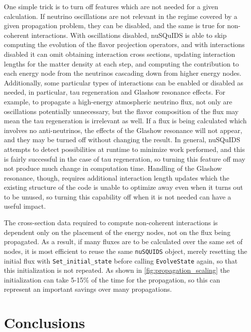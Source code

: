\documentclass[3p,12pt]{elsarticle}
\newcommand{\ttf}{\ttfamily}
\begin{document}
One simple trick is to turn off features which are not needed for a given calculation. 
If neutrino oscillations are not relevant in the regime covered by a given propagation problem, they can be disabled, and the same is true for non-coherent interactions. 
With oscillations disabled, {\ttf nuSQuIDS} is able to skip computing the evolution of the flavor projection operators, and with interactions disabled it can omit obtaining interaction cross sections, updating interaction lengths for the matter density at each step, and computing the contribution to each energy node from the neutrinos cascading down from higher energy nodes. 
Additionally, some particular types of interactions can be enabled or disabled as needed, in particular, tau regeneration and Glashow resonance effects. 
For example, to propagate a high-energy atmospheric neutrino flux, not only are oscillations potentially unnecessary, but the flavor composition of the flux may mean the tau regeneration is irrelevant as well. 
If a flux is being calculated which involves no anti-neutrinos, the effects of the Glashow resonance will not appear, and they may be turned off without changing the result. 
In general, {\ttf nuSQuIDS} attempts to detect possibilities at runtime to minimize work performed, and this is fairly successful in the case of tau regeneration, so turning this feature off may not produce much change in computation time. 
Handling of the Glashow resonance, though, requires additional interaction length updates which the existing structure of the code is unable to optimize away even when it turns out to be unused, so turning this capability off when it is not needed can have a useful impact. 

The cross-section data required to compute non-coherent interactions is dependent only on the placement of the energy nodes, not on the flux being propagated. 
As a result, if many fluxes are to be calculated over the same set of nodes, it is most efficient to reuse the same \lstinline{nuSQUIDS} object, merely resetting the initial flux with \lstinline{Set_initial_state} before calling \lstinline{EvolveState} again, so that this initialization is not repeated. 
As shown in \ref{fig:propagation_scaling} the initialization can take 5-15\% of the time for the propagation, so this can represent an important savings over many propagations. 

\section{Conclusions}
\label{sec:conclu}
\end{document}
